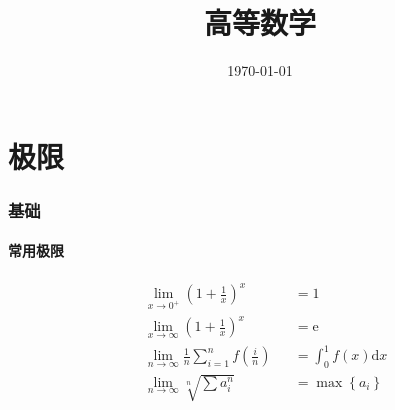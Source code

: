 \documentclass{article}
\title{高等数学}
\author{}
\date{\today}
\begin{document}
\hypersetup{
    hidelinks,
    allcolors = black,
    breaklinks = true
}

\newtheorem{definition}{Definition}[subsection]
\newtheorem{theorem}{Theorem}[subsection]
\newtheorem{corollary}{Corollary}[theorem]
\renewcommand{\proofname}{\indent\bf Proof}
\renewcommand{\Re}{\operatorname{Re}}
\renewcommand{\Im}{\operatorname{Im}}

\def\e{\mathrm e}
\def\i{\mathrm i}
\def\d{\mathrm d}
\def\C{\mathrm C}
\def\sr{\mathbb R}
\def\sn{\mathbb N}
\def\snp{\mathbb N^+}
\def\sc{\mathbb C}
\def\sz{\mathbb Z}
\def\sech{\mathrm{sech}}
\def\csch{\mathrm{csch}}

\newcommand{\abs}[1]{\left|#1\right|}
\newcommand{\norm}[1]{\left\Vert#1\right\Vert}
\newcommand{\p}[1]{\left(#1\right)}
\newcommand{\br}[1]{\left[#1\right]}
\newcommand{\B}[1]{\left\{#1\right\}}
\newcommand{\jacobi}[2]{\frac{\partial\p{#1}}{\partial\p{#2}}}

\begin{titlepage}
    \maketitle
\end{titlepage}

\tableofcontents
\newpage

\part{极限}

\section{基础}

\subsection{常用极限}

\[\begin{aligned}
         & \lim_{x\to0^+}{\p{1+\frac1x}^x}                     &  & =1                  \\
         & \lim_{x\to\infty}{\p{1+\frac1x}^x}                  &  & =\e                 \\
         & \lim_{n\to\infty}{\frac1n\sum_{i=1}^nf\p{\frac in}} &  & =\int_0^1f\p{x}\d x \\
         & \lim_{n\to\infty}{\sqrt[n]{\sum a_i^n}}             &  & =\max{\B{a_i}}
    \end{aligned}\]
\end{document}

